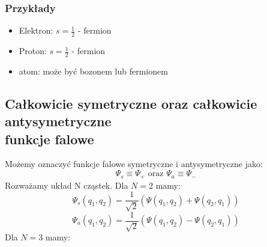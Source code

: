 \subsubsection{Przykłady}
\begin{itemize}
    \item Elektron: $s = \frac{1}{2}$ - fermion
    \item Proton: $s = \frac{1}{2}$ - fermion
    \item atom: może być bozonem lub fermionem
\end{itemize}
%
\subsection{Całkowicie symetryczne oraz całkowicie antysymetryczne \\ funkcje falowe}
%
Możemy oznaczyć funkcje falowe symetryczne i antysymetryczne jako:
%
\begin{equation*}
    \Psi_s \equiv \Psi_+ \text{ oraz } \Psi_a \equiv \Psi_-
\end{equation*}
Rozważamy układ N cząstek.
%
Dla $N = 2$ mamy:
%
\begin{equation*}
    \Psi_s (q_1, q_2) = \frac{1}{\sqrt{2}} \left( \Psi(q_1, q_2) + \Psi(q_2, q_1) \right)
\end{equation*}
%
\begin{equation*}
    \Psi_a (q_1, q_2) = \frac{1}{\sqrt{2}} \left( \Psi(q_1, q_2) - \Psi(q_2, q_1) \right)
\end{equation*}
%
Dla $N = 3$ mamy:
%

